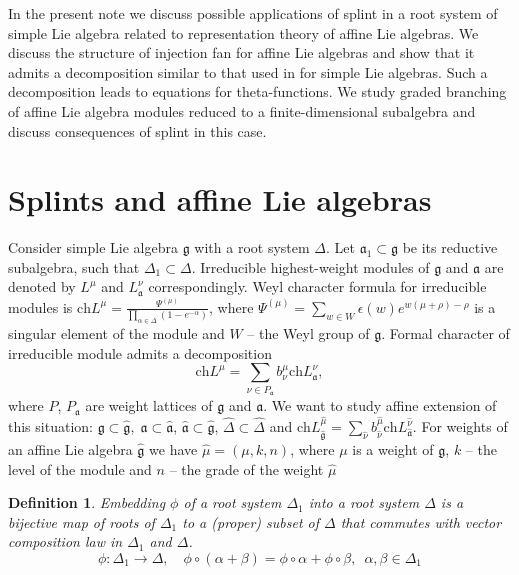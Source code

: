 \documentclass[12pt]{article}
\newtheorem{Def}{Definition}[section]
\newcommand{\gf}{\mathfrak{g}}
\newcommand{\af}{\mathfrak{a}}
\newcommand{\gfh}{\hat{\mathfrak{g}}}
\newcommand{\afh}{\hat{\mathfrak{a}}}
\begin{document}
In the present note we discuss possible applications of splint in
a root system of simple Lie algebra related to representation
theory of affine Lie algebras. We discuss the structure of
injection fan for affine Lie algebras and show that it admits a
decomposition similar to that used in \cite{2011arXiv1111.6787L}
for simple Lie algebras. Such a decomposition leads to equations
for theta-functions. We study graded branching of affine Lie
algebra modules reduced to a finite-dimensional subalgebra and
discuss consequences of splint in this case.

\section{Splints and affine Lie algebras}
\label{sec:definitions}

Consider simple Lie algebra $\gf$ with a root system $\Delta$. Let
$\af_{1}\subset \gf$ be its reductive subalgebra, such that
$\Delta_{1}\subset\Delta$. Irreducible highest-weight modules of
$\gf$ and $\af$ are denoted by $L^{\mu}$ and $L^{\nu}_{\af}$
correspondingly. Weyl character formula for irreducible modules is
$\mathrm{ch}L^{\mu}=\frac{\Psi^{(\mu)}}{\prod_{\alpha\in\Delta}(1-e^{-\alpha})}$,
where $\Psi^{(\mu)}=\sum_{w\in W}\epsilon(w) e^{w(\mu+\rho)-\rho}$
is a singular element of the module and $W$ -- the Weyl group of
$\gf$. Formal character of irreducible module admits a
decomposition
\begin{equation}
  \label{eq:4}
  \mathrm{ch} L^{\mu}=\sum_{\nu\in P_{\af}} b^{\mu}_{\nu} \mathrm{ch} L^{\nu}_{\af},
\end{equation}
where $P$, $P_{\af}$ are weight lattices of $\gf$ and $\af$. We
want to study affine extension of this situation:
$\gf\subset\gfh,\; \af\subset\afh$, $\afh\subset\gfh$,
$\hat{\Delta}\subset\hat{\Delta}$ and
$\mathrm{ch}L^{\hat{\mu}}_{\gfh}=\sum_{\hat{\nu}}
b^{\hat{\mu}}_{\hat{\nu}} \mathrm{ch} L^{\hat{\nu}}_{\afh}$. For
weights of an affine Lie algebra $\gfh$ we have
$\hat{\mu}=(\mu,k,n)$, where $\mu$ is a weight of $\gf$, $k$ --
the level of the module and $n$ -- the grade of the weight
$\hat{\mu}$

\begin{Def}
  Embedding $\phi$ of a root system $\Delta_1$ into a root system $\Delta$ is a bijective map of
  roots of $\Delta_{1}$ to a (proper) subset of $\Delta$ that commutes with vector composition law
  in $\Delta_{1}$ and $\Delta$.
\begin{equation*}
\phi:\Delta_1 \longrightarrow \Delta, \quad \phi \circ (\alpha + \beta) =\phi \circ \alpha + \phi \circ \beta,\,\,\, \alpha,\beta \in \Delta_1
\end{equation*}
\end{Def}
\end{document}
